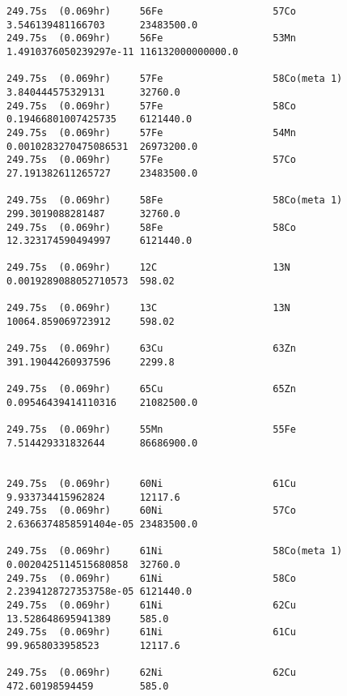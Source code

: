 \begin{lstlisting}[style=sOutputFile,caption={Final results for steel irradiation},label={listing:alexsteel}]
249.75s  (0.069hr)     56Fe                   57Co                   3.546139481166703      23483500.0            
249.75s  (0.069hr)     56Fe                   53Mn                   1.4910376050239297e-11 116132000000000.0     

249.75s  (0.069hr)     57Fe                   58Co(meta 1)           3.840444575329131      32760.0               
249.75s  (0.069hr)     57Fe                   58Co                   0.19466801007425735    6121440.0             
249.75s  (0.069hr)     57Fe                   54Mn                   0.0010283270475086531  26973200.0            
249.75s  (0.069hr)     57Fe                   57Co                   27.191382611265727     23483500.0            

249.75s  (0.069hr)     58Fe                   58Co(meta 1)           299.3019088281487      32760.0               
249.75s  (0.069hr)     58Fe                   58Co                   12.323174590494997     6121440.0             

249.75s  (0.069hr)     12C                    13N                    0.0019289088052710573  598.02                

249.75s  (0.069hr)     13C                    13N                    10064.859069723912     598.02                

249.75s  (0.069hr)     63Cu                   63Zn                   391.19044260937596     2299.8                

249.75s  (0.069hr)     65Cu                   65Zn                   0.09546439414110316    21082500.0            

249.75s  (0.069hr)     55Mn                   55Fe                   7.514429331832644      86686900.0            


249.75s  (0.069hr)     60Ni                   61Cu                   9.933734415962824      12117.6               
249.75s  (0.069hr)     60Ni                   57Co                   2.6366374858591404e-05 23483500.0            

249.75s  (0.069hr)     61Ni                   58Co(meta 1)           0.0020425114515680858  32760.0               
249.75s  (0.069hr)     61Ni                   58Co                   2.2394128727353758e-05 6121440.0             
249.75s  (0.069hr)     61Ni                   62Cu                   13.528648695941389     585.0                 
249.75s  (0.069hr)     61Ni                   61Cu                   99.9658033958523       12117.6               

249.75s  (0.069hr)     62Ni                   62Cu                   472.60198594459        585.0                 


\end{lstlisting}
